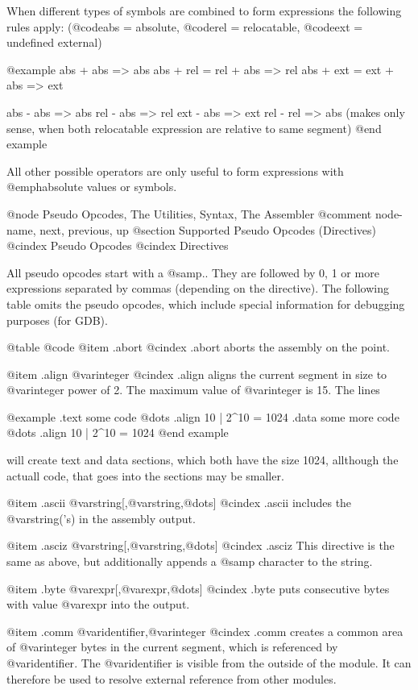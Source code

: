 {{{{{When different types of symbols are combined to form expressions the 
following rules apply: (@code{abs} = absolute, @code{rel} = relocatable,
@code{ext} = undefined external)

@example
abs + abs => abs
abs + rel = rel + abs => rel
abs + ext = ext + abs => ext

abs - abs => abs
rel - abs => rel
ext - abs => ext
rel - rel => abs
(makes only sense, when both relocatable expression are relative to
same segment)
@end example

All other possible operators are only useful to form expressions with
@emph{absolute} values or symbols.

@node     Pseudo Opcodes, The Utilities, Syntax, The Assembler  
@comment  node-name,      next,          previous, up
@section Supported Pseudo Opcodes (Directives)
@cindex Pseudo Opcodes
@cindex Directives

All pseudo opcodes start with a @samp{.}. They are followed by 0, 1 or
more expressions separated by commas (depending on the directive). The
following table omits the pseudo opcodes, which include special 
information for debugging purposes (for GDB).

@table @code
@item .abort
@cindex .abort
aborts the assembly on the point.

@item .align @var{integer}
@cindex .align
aligns the current segment in size to @var{integer} power of 2. The 
maximum value of @var{integer} is 15. The lines

@example
.text
some code @dots{}
.align 10               | 2^10 = 1024
.data
some more code @dots{}
.align 10               | 2^10 = 1024
@end example

will create text and data sections, which both have the size 1024,
allthough the actuall code, that goes into the sections may be smaller.

@item .ascii @var{string}[,@var{string},@dots{}]
@cindex .ascii
includes the @var{string}('s) in the assembly output.

@item .asciz @var{string}[,@var{string},@dots{}]
@cindex .asciz
This directive is the same as above, but additionally appends a
@samp{\0} character to the string.

@item .byte @var{expr}[,@var{expr},@dots{}]
@cindex .byte
puts consecutive bytes with value @var{expr} into the output.

@item .comm @var{identifier},@var{integer}
@cindex .comm
creates a common area of @var{integer} bytes in the current segment,
which is referenced by @var{identifier}. The @var{identifier} is 
visible from the outside of the module. It can therefore be used to
resolve external reference from other modules.

}}}}}

